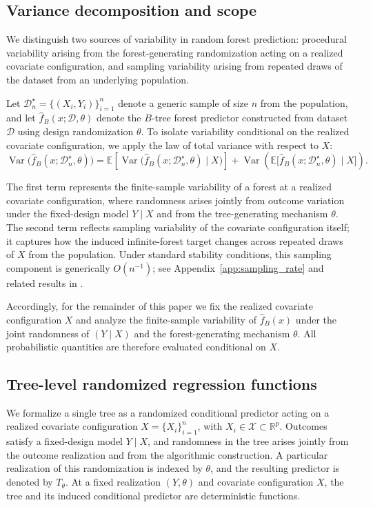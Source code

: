 \documentclass[11pt]{article}
\theoremstyle{plain}
\theoremstyle{definition}
\theoremstyle{remark}
\DeclareMathOperator{\Var}{Var}
\begin{document}
\subsection{Variance decomposition and scope}
\label{subsec:variance_decomp}

We distinguish two sources of variability in random forest prediction: procedural variability arising from the forest-generating randomization acting on a realized covariate configuration, and sampling variability arising from repeated draws of the dataset from an underlying population.

Let $\mathcal D_n^\star=\{(X_i,Y_i)\}_{i=1}^n$ denote a generic sample of size $n$ from the population, and let $\hat f_B(x;\mathcal D,\theta)$ denote the $B$-tree forest predictor constructed from dataset $\mathcal D$ using design randomization $\theta$. To isolate variability conditional on the realized covariate configuration, we apply the law of total variance with respect to $X$:
\[
\Var\!\bigl(\hat f_B(x;\mathcal D_n^\star,\theta)\bigr)
=
\mathbb E\!\left[
\Var\!\bigl(\hat f_B(x;\mathcal D_n^\star,\theta)\mid X\bigr)
\right]
+
\Var\!\left(
\mathbb E\!\bigl[\hat f_B(x;\mathcal D_n^\star,\theta)\mid X\bigr]
\right).
\]

The first term represents the finite-sample variability of a forest at a realized covariate configuration, where randomness arises jointly from outcome variation under the fixed-design model $Y \mid X$ and from the tree-generating mechanism $\theta$. The second term reflects sampling variability of the covariate configuration itself; it captures how the induced infinite-forest target changes across repeated draws of $X$ from the population. Under standard stability conditions, this sampling component is generically $O(n^{-1})$; see Appendix~\ref{app:sampling_rate} and related results in \citet{mentch2016,wager2018}.

Accordingly, for the remainder of this paper we fix the realized covariate configuration $X$ and analyze the finite-sample variability of $\hat f_B(x)$ under the joint randomness of $(Y \mid X)$ and the forest-generating mechanism $\theta$. All probabilistic quantities are therefore evaluated conditional on $X$.

\subsection{Tree-level randomized regression functions}
\label{subsec:tree_level}

We formalize a single tree as a randomized conditional predictor acting on a realized covariate configuration $X=\{X_i\}_{i=1}^n$, with $X_i\in\mathcal X\subset\mathbb R^p$. Outcomes satisfy a fixed-design model $Y\mid X$, and randomness in the tree arises jointly from the outcome realization and from the algorithmic construction. A particular realization of this randomization is indexed by $\theta$, and the resulting predictor is denoted by $T_\theta$. At a fixed realization $(Y,\theta)$ and covariate configuration $X$, the tree and its induced conditional predictor are deterministic functions.
\end{document}
